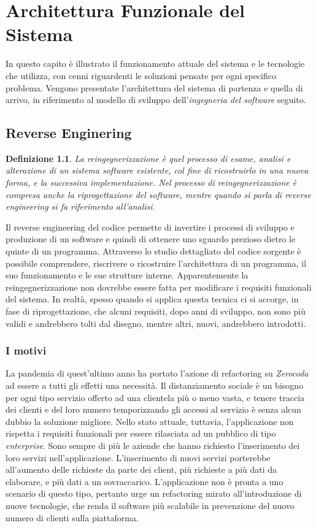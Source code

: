 \chapter{Architettura Funzionale del Sistema}
\label{chap:systemdesign}
In questo capito è illustrato il funzionamento attuale del sistema e le tecnologie che utilizza, con cenni riguardenti le soluzioni pensate per ogni specifico problema. Vengono presentate l'architettura del sistema di partenza e quella di arrivo, in riferimento al modello di sviluppo dell'\emph{ingegneria del software} seguito.

\section{Reverse Enginering}
\newtheorem*{def:reverseengineering}{Definizione}
\begin{def:reverseengineering}
    La reingegnerizzazione è quel processo di esame, analisi e alterazione di un sistema software esistente, col fine di ricostruirlo in una nuova forma, e la successiva implementazione. \cite{chikofsky:reverseengineering} Nel processo di reingegnerizzazione è compresa anche la riprogettazione del software, mentre quando si parla di reverse engineering si fa riferimento all'analisi.
\end{def:reverseengineering}
Il reverse engineering del codice permette di invertire i processi di sviluppo e produzione di un software e quindi di ottenere uno sguardo prezioso dietro le quinte di un programma. Attraverso lo studio dettagliato del codice sorgente è possibile comprendere, riscrivere o ricostruire l’architettura di un programma, il suo funzionamento e le sue strutture interne. Apparentemente la reingegnerizzazione non dovrebbe essere fatta per modificare i requisiti funzionali del sistema. In realtà, spesso quando si applica questa tecnica ci si accorge, in fase di riprogettazione, che alcuni requisiti, dopo anni di sviluppo, non sono più validi e andrebbero tolti dal disegno, mentre altri, nuovi, andrebbero introdotti.

\subsection{I motivi}
La pandemia di quest'ultimo anno ha portato l'azione di refactoring su \emph{Zerocoda} ad essere a tutti gli effetti una necessità. Il distanziamento sociale è un bisogno per ogni tipo servizio offerto ad una clientela più o meno vasta, e tenere traccia dei clienti e del loro numero temporizzando gli accessi al servizio è senza alcun dubbio la soluzione migliore. Nello stato attuale, tuttavia, l'applicazione non rispetta i requisiti funzionali per essere rilasciata ad un pubblico di tipo \emph{enterprise}. Sono sempre di più le aziende che hanno richiesto l'inserimento dei loro servizi nell'applicazione. L'inserimento di nuovi servizi porterebbe all'aumento delle richieste da parte dei client, più richieste a più dati da elaborare, e più dati a un sovraccarico. L'applicazione non è pronta a uno scenario di questo tipo, pertanto urge un refactoring mirato all'introduzione di nuove tecnologie, che renda il software più scalabile in prevenzione del nuovo numero di clienti sulla piattaforma.


